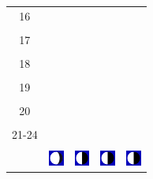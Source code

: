 \documentclass[a4paper,12pt, tikz]{scrartcl}
\begin{document}
\begin{tabularx}{\linewidth}{|c|X|X|p{2cm}|p{2cm}|}
            &   &       &    &   \\
          \hline
          16&   &                 &    &   \\
            &   &       &    &   \\
          \hline
          17&   &                 &    &   \\
            &   &       &    &   \\
          \hline
          18&   &                 &    &   \\
            &   &       &    &   \\
          \hline
          19&   &                 &     &   \\
            &   &       &    &   \\
          \hline
          20&   &              &    &   \\
            &   &       &    &   \\
          \hline 
          21-24&   &              &    &   \\
            &   &       &    &   \\
          \hline
                      & \vspace{0.01cm} \centerline{\includegraphics[width=0.5cm]{moon_phases/Moon_phase_5.svg.png}} \vspace{0.1cm} & \vspace{0.01cm} \centerline{\includegraphics[width=0.5cm]{moon_phases/Moon_phase_6.svg.png}} \vspace{0.1cm} & \vspace{0.01cm} \centerline{\includegraphics[width=0.5cm]{moon_phases/Moon_phase_6.svg.png}} \vspace{0.1cm} & \vspace{0.01cm} \centerline{\includegraphics[width=0.5cm]{moon_phases/Moon_phase_6.svg.png}} \vspace{0.1cm}\\
          \hline    
        \end{tabularx}
\end{document}

